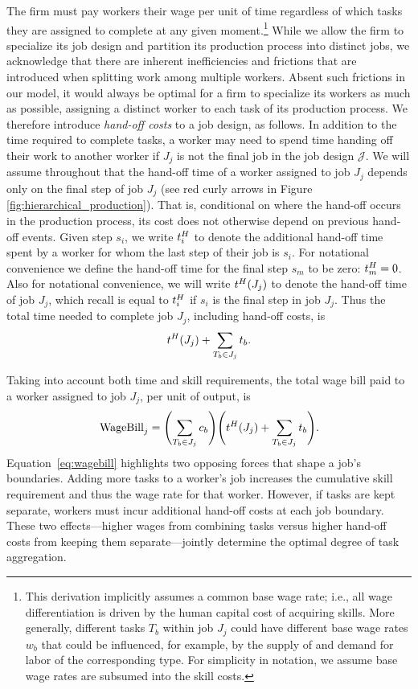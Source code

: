 The firm must pay workers their wage per unit of time regardless of which tasks they are assigned to complete at any given moment.\footnote{
This derivation implicitly assumes a common base wage rate; i.e., all wage differentiation is driven by the human capital cost of acquiring skills.
More generally, different tasks $T_b$ within job $J_j$ could have different base wage rates $w_b$ that could be influenced, for example, by the supply of and demand for labor of the corresponding type.
For simplicity in notation, we assume base wage rates are subsumed into the skill costs.
}
While we allow the firm to specialize its job design and partition its production process into distinct jobs, we acknowledge that there are inherent inefficiencies and frictions that are introduced when splitting work among multiple workers.
Absent such frictions in our model, it would always be optimal for a firm to specialize its workers as much as possible, assigning a distinct worker to each task of its production process. 
We therefore introduce \emph{hand-off costs} to a job design, as follows.
In addition to the time required to complete tasks, a worker may need to spend time handing off their work to another worker if $J_j$ is not the final job in the job design $\mathcal{J}$.
We will assume throughout that the hand-off time of a worker assigned to job $J_j$ depends only on the final step of job $J_j$ (see red curly arrows in Figure \ref{fig:hierarchical_production}).
That is, conditional on where the hand-off occurs in the production process, its cost does not otherwise depend on previous hand-off events.
Given step $s_i$, we write $t^{H}_{i}$ to denote the additional hand-off time spent by a worker for whom the last step of their job is $s_i$.
For notational convenience we define the hand-off time for the final step $s_m$ to be zero: $t^{H}_{m} = 0$.
Also for notational convenience, we will write $t^{H}_{}(J_j)$ to denote the hand-off time of job $J_j$, which recall is equal to $t^{H}_{i}$ if $s_i$ is the final step in job $J_j$.
Thus the total time needed to complete job $J_j$, including hand-off costs, is
\[
t^{H}_{}(J_j) + \sum_{T_b \in J_j} t_{b}.
\]

Taking into account both time and skill requirements, the total wage bill paid to a worker assigned to job $J_j$, per unit of output, is
\begin{align}
\label{eq:wagebill}
\text{WageBill}_j = \Biggl(\sum_{T_b \in J_j} c_{b} \Biggr) \Biggl(t^{H}_{}(J_j) + \sum_{T_b \in J_j} t_{b} \Biggr).
\end{align}
Equation~\eqref{eq:wagebill} highlights two opposing forces that shape a job's boundaries.  
Adding more tasks to a worker's job increases the cumulative skill requirement and thus the wage rate for that worker.  
However, if tasks are kept separate, workers must incur additional hand-off costs at each job boundary.  
These two effects---higher wages from combining tasks versus higher hand-off costs from keeping them separate---jointly determine the optimal degree of task aggregation.  




